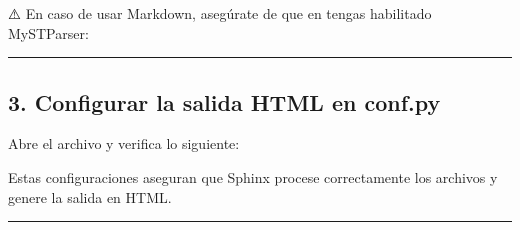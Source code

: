 \documentclass[a4paper,10pt,spanish]{sphinxmanual}
\begin{document}
\sphinxAtStartPar
⚠️  En caso de usar Markdown, asegúrate de que en  tengas habilitado MyST\sphinxhyphen{}Parser:

\begin{sphinxVerbatim}[commandchars=\\\{\}]
  \PYG{p}{[}
\PYG{p}{]}
\end{sphinxVerbatim}


\bigskip\hrule\bigskip



\subsection{3. Configurar la salida HTML en conf.py}
\label{\detokenize{configuracion_inicial/008.Generar_HTML:configurar-la-salida-html-en-conf-py}}
\sphinxAtStartPar
Abre el archivo  y verifica lo siguiente:

\begin{sphinxVerbatim}[commandchars=\\\{\}]
  

  \PYG{p}{[}\PYG{p}{]}

  
     
     
\end{sphinxVerbatim}

\sphinxAtStartPar
Estas configuraciones aseguran que Sphinx procese correctamente los archivos  y genere la salida en HTML.


\bigskip\hrule\bigskip
\end{document}
